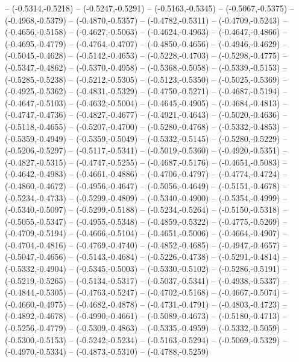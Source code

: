 {	-- (-0.5314,-0.5218)
	-- (-0.5247,-0.5291)
	-- (-0.5163,-0.5345)
	-- (-0.5067,-0.5375)
	-- (-0.4968,-0.5379)
	-- (-0.4870,-0.5357)
	-- (-0.4782,-0.5311)
	-- (-0.4709,-0.5243)
	-- (-0.4656,-0.5158)
	-- (-0.4627,-0.5063)
	-- (-0.4624,-0.4963)
	-- (-0.4647,-0.4866)
	-- (-0.4695,-0.4779)
	-- (-0.4764,-0.4707)
	-- (-0.4850,-0.4656)
	-- (-0.4946,-0.4629)
	-- (-0.5045,-0.4628)
	-- (-0.5142,-0.4653)
	-- (-0.5228,-0.4703)
	-- (-0.5298,-0.4775)
	-- (-0.5347,-0.4862)
	-- (-0.5370,-0.4958)
	-- (-0.5368,-0.5058)
	-- (-0.5339,-0.5153)
	-- (-0.5285,-0.5238)
	-- (-0.5212,-0.5305)
	-- (-0.5123,-0.5350)
	-- (-0.5025,-0.5369)
	-- (-0.4925,-0.5362)
	-- (-0.4831,-0.5329)
	-- (-0.4750,-0.5271)
	-- (-0.4687,-0.5194)
	-- (-0.4647,-0.5103)
	-- (-0.4632,-0.5004)
	-- (-0.4645,-0.4905)
	-- (-0.4684,-0.4813)
	-- (-0.4747,-0.4736)
	-- (-0.4827,-0.4677)
	-- (-0.4921,-0.4643)
	-- (-0.5020,-0.4636)
	-- (-0.5118,-0.4655)
	-- (-0.5207,-0.4700)
	-- (-0.5280,-0.4768)
	-- (-0.5332,-0.4853)
	-- (-0.5359,-0.4949)
	-- (-0.5359,-0.5049)
	-- (-0.5332,-0.5145)
	-- (-0.5280,-0.5229)
	-- (-0.5206,-0.5297)
	-- (-0.5117,-0.5341)
	-- (-0.5019,-0.5360)
	-- (-0.4920,-0.5351)
	-- (-0.4827,-0.5315)
	-- (-0.4747,-0.5255)
	-- (-0.4687,-0.5176)
	-- (-0.4651,-0.5083)
	-- (-0.4642,-0.4983)
	-- (-0.4661,-0.4886)
	-- (-0.4706,-0.4797)
	-- (-0.4774,-0.4724)
	-- (-0.4860,-0.4672)
	-- (-0.4956,-0.4647)
	-- (-0.5056,-0.4649)
	-- (-0.5151,-0.4678)
	-- (-0.5234,-0.4733)
	-- (-0.5299,-0.4809)
	-- (-0.5340,-0.4900)
	-- (-0.5354,-0.4999)
	-- (-0.5340,-0.5097)
	-- (-0.5299,-0.5188)
	-- (-0.5234,-0.5264)
	-- (-0.5150,-0.5318)
	-- (-0.5055,-0.5347)
	-- (-0.4955,-0.5348)
	-- (-0.4859,-0.5322)
	-- (-0.4775,-0.5269)
	-- (-0.4709,-0.5194)
	-- (-0.4666,-0.5104)
	-- (-0.4651,-0.5006)
	-- (-0.4664,-0.4907)
	-- (-0.4704,-0.4816)
	-- (-0.4769,-0.4740)
	-- (-0.4852,-0.4685)
	-- (-0.4947,-0.4657)
	-- (-0.5047,-0.4656)
	-- (-0.5143,-0.4684)
	-- (-0.5226,-0.4738)
	-- (-0.5291,-0.4814)
	-- (-0.5332,-0.4904)
	-- (-0.5345,-0.5003)
	-- (-0.5330,-0.5102)
	-- (-0.5286,-0.5191)
	-- (-0.5219,-0.5265)
	-- (-0.5134,-0.5317)
	-- (-0.5037,-0.5341)
	-- (-0.4938,-0.5337)
	-- (-0.4844,-0.5305)
	-- (-0.4763,-0.5247)
	-- (-0.4702,-0.5168)
	-- (-0.4667,-0.5074)
	-- (-0.4660,-0.4975)
	-- (-0.4682,-0.4878)
	-- (-0.4731,-0.4791)
	-- (-0.4803,-0.4723)
	-- (-0.4892,-0.4678)
	-- (-0.4990,-0.4661)
	-- (-0.5089,-0.4673)
	-- (-0.5180,-0.4713)
	-- (-0.5256,-0.4779)
	-- (-0.5309,-0.4863)
	-- (-0.5335,-0.4959)
	-- (-0.5332,-0.5059)
	-- (-0.5300,-0.5153)
	-- (-0.5242,-0.5234)
	-- (-0.5163,-0.5294)
	-- (-0.5069,-0.5329)
	-- (-0.4970,-0.5334)
	-- (-0.4873,-0.5310)
	-- (-0.4788,-0.5259)
}
